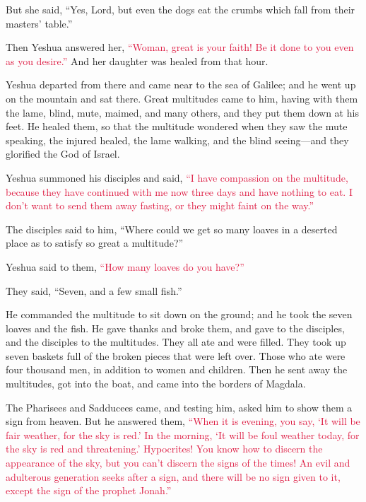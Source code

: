 \myverse{}But she said, “Yes, Lord, but even the dogs eat the crumbs which
fall from their masters’ table.”

\myverse{}Then Yeshua answered her,
\textcolor{crimson}{“Woman, great is your faith! Be it done to you even as you desire.”} And her daughter was healed
from that hour.

\myverse{}Yeshua departed from there and came near to the sea of Galilee;
and he went up on the mountain and sat there.
\myverse{}Great multitudes came to him, having with them the lame, blind, mute, maimed,
and many others, and they put them down at his feet. He healed them,
\myverse{}so that the multitude wondered when they saw the mute speaking, the injured
healed, the lame walking, and the blind seeing—and they glorified the God of Israel.

\myverse{}Yeshua summoned his disciples and said,
\textcolor{crimson}{“I have compassion on the multitude, because they have continued with me now three days and have nothing
	to eat. I don’t want to send them away fasting, or they might faint on the way.”
}

\myverse{}The disciples said to him, “Where could we get so many loaves
in a deserted place as to satisfy so great a multitude?”

\myverse{}Yeshua said to them,
\textcolor{crimson}{“How many loaves do you have?”}

They said, “Seven, and a few small fish.”

\myverse{}He commanded the multitude to sit down on the ground;
\myverse{}and he took the seven loaves and the fish. He gave thanks and broke them,
and gave to the disciples, and the disciples to the multitudes.
\myverse{}They all ate and were filled. They took up seven baskets full of the broken
pieces that were left over.
\myverse{}Those who ate were four thousand men, in addition to women and children.
\myverse{}Then he sent away the multitudes, got into the boat, and came into the borders
of Magdala.


\mychapter{} \myverse*{}The Pharisees and Sadducees came, and testing him, asked him to
show them a sign from heaven.
\myverse{}But he answered them,
\textcolor{crimson}{“When it is evening, you say, ‘It will be fair weather, for the sky is red.’
}
\myverse{}\textcolor{crimson}{In the morning, ‘It will be foul weather today, for the sky is red and
	threatening.’ Hypocrites! You know how to discern the appearance of the sky, but you can’t discern the
	signs of the times!
}
\myverse{}\textcolor{crimson}{An evil and adulterous generation seeks after a sign, and there will be
	no sign given to it, except the sign of the prophet Jonah.”}

